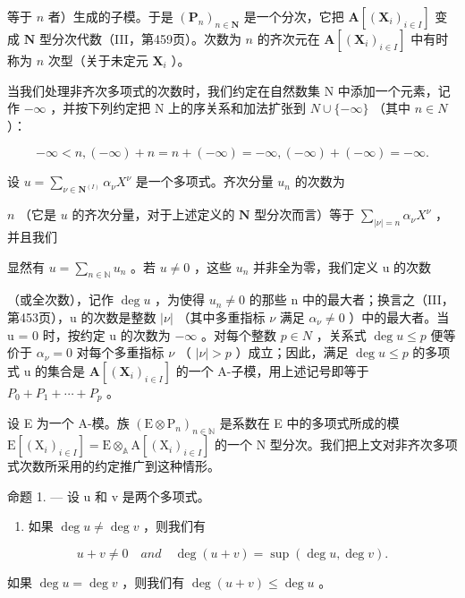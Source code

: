 等于 \(n\) 者）生成的子模。于是 \((\mathbf{P}_n)_{n \in \mathbf{N}}\) 是一个分次，它把 \(\mathbf{A}[(\mathbf{X}_i)_{i \in I}]\) 变成 \(\mathbf{N}\) 型分次代数（III，第459页）。次数为 \(n\) 的齐次元在 \(\mathbf{A}[(\mathbf{X}_i)_{i \in I}]\) 中有时称为 \(n\) 次型（关于未定元 \(\mathbf{X}_i\) ）。

当我们处理非齐次多项式的次数时，我们约定在自然数集 N 中添加一个元素，记作 \(-\infty\) ，并按下列约定把 N 上的序关系和加法扩张到 \(N \cup \{-\infty\}\) （其中 \(n \in N\) ）：

\[
- \infty <   n, (- \infty) + n = n + (- \infty) = - \infty , (- \infty) + (- \infty) = - \infty .
\]

设 \(u = \sum_{\nu \in \mathbf{N}^{(I)}} \alpha_{\nu} X^{\nu}\) 是一个多项式。齐次分量 \(u_{n}\) 的次数为

\(n\) （它是 \(u\) 的齐次分量，对于上述定义的 \(\mathbf{N}\) 型分次而言）等于 \(\sum_{|\nu| = n} \alpha_{\nu} X^{\nu}\) ，并且我们

显然有 \(u = \sum_{n \in \mathbb{N}} u_n\) 。若 \(u \neq 0\) ，这些 \(u_n\) 并非全为零，我们定义 u 的次数

（或全次数），记作 \(\deg u\) ，为使得 \(u_{n} \neq 0\) 的那些 n 中的最大者；换言之（III，第453页），u 的次数是整数 \(|\nu|\) （其中多重指标 \(\nu\) 满足 \(\alpha_{\nu} \neq 0\) ）中的最大者。当 u = 0 时，按约定 u 的次数为 \(-\infty\) 。对每个整数 \(p \in N\) ，关系式 \(\deg u \leqslant p\) 便等价于 \(\alpha_{\nu} = 0\) 对每个多重指标 \(\nu\) （ \(|\nu| > p\) ）成立；因此，满足 \(\deg u \leqslant p\) 的多项式 u 的集合是 \(\mathbf{A}[(\mathbf{X}_{i})_{i \in I}]\) 的一个 A-子模，用上述记号即等于 \(P_{0} + P_{1} + \cdots + P_{p}\) 。

设 E 为一个 A-模。族 \((\mathrm{E} \otimes \mathrm{P}_{n})_{n \in \mathbb{N}}\) 是系数在 E 中的多项式所成的模 \(\mathrm{E}[(\mathrm{X}_{i})_{i \in I}] = \mathrm{E} \otimes_{\mathbb{A}} \mathrm{A}[(\mathrm{X}_{i})_{i \in I}]\) 的一个 N 型分次。我们把上文对非齐次多项式次数所采用的约定推广到这种情形。

命题 1. --- 设 u 和 v 是两个多项式。

\begin{enumerate}
\def\labelenumi{(\roman{enumi})}
\tightlist
\item
  如果 \(\deg u \neq \deg v\) ，则我们有
\end{enumerate}

\[
u + v \neq 0 \quad a n d \quad \deg (u + v) = \sup (\deg u, \deg v).
\]

如果 \(\deg u = \deg v\) ，则我们有 \(\deg (u + v) \leqslant \deg u\) 。


